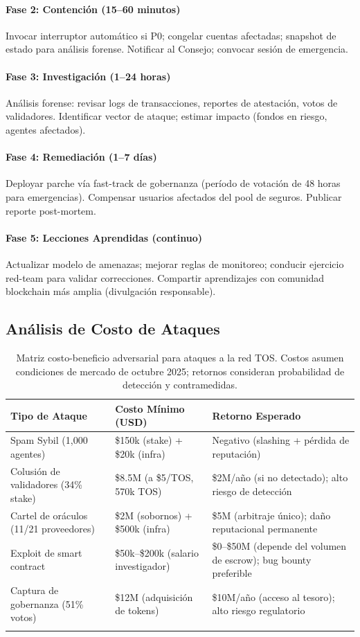 \documentclass[11pt]{article}
\begin{document}
\paragraph{Fase 2: Contención (15--60 minutos)}
Invocar interruptor automático si P0; congelar cuentas afectadas; snapshot de estado para análisis forense. Notificar al Consejo; convocar sesión de emergencia.

\paragraph{Fase 3: Investigación (1--24 horas)}
Análisis forense: revisar logs de transacciones, reportes de atestación, votos de validadores. Identificar vector de ataque; estimar impacto (fondos en riesgo, agentes afectados).

\paragraph{Fase 4: Remediación (1--7 días)}
Deployar parche vía fast-track de gobernanza (período de votación de 48 horas para emergencias). Compensar usuarios afectados del pool de seguros. Publicar reporte post-mortem.

\paragraph{Fase 5: Lecciones Aprendidas (continuo)}
Actualizar modelo de amenazas; mejorar reglas de monitoreo; conducir ejercicio red-team para validar correcciones. Compartir aprendizajes con comunidad blockchain más amplia (divulgación responsable).

\subsection{Análisis de Costo de Ataques}

\begin{longtable}{@{}p{}p{}p{}@{}}
\toprule
\textbf{Tipo de Ataque} & \textbf{Costo Mínimo (USD)} & \textbf{Retorno Esperado} \\\midrule
Spam Sybil (1,000 agentes) & \$150k (stake) + \$20k (infra) & Negativo (slashing + pérdida de reputación) \\
Colusión de validadores (34\% stake) & \$8.5M (a \$5/TOS, 570k TOS) & \$2M/año (si no detectado); alto riesgo de detección \\
Cartel de oráculos (11/21 proveedores) & \$2M (sobornos) + \$500k (infra) & \$5M (arbitraje único); daño reputacional permanente \\
Exploit de smart contract & \$50k--\$200k (salario investigador) & \$0--\$50M (depende del volumen de escrow); bug bounty preferible \\
Captura de gobernanza (51\% votos) & \$12M (adquisición de tokens) & \$10M/año (acceso al tesoro); alto riesgo regulatorio \\
\bottomrule
\caption{Matriz costo-beneficio adversarial para ataques a la red TOS. Costos asumen condiciones de mercado de octubre 2025; retornos consideran probabilidad de detección y contramedidas.}
\end{longtable}
\end{document}

